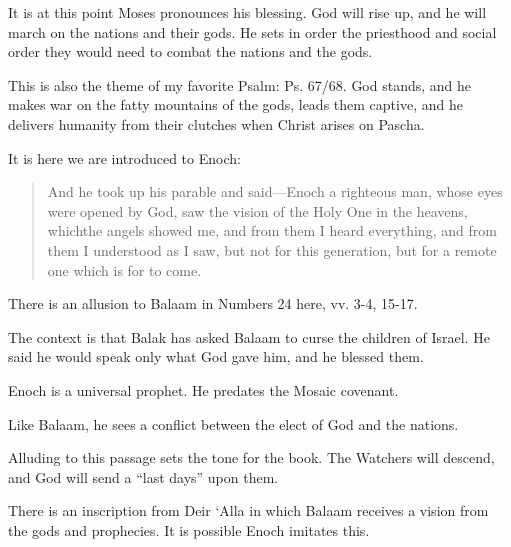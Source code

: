 \documentclass{beamer}
\begin{document}
\begin{frame}
  It is at this point Moses pronounces his blessing.
  God will rise up, and he will march on the nations and their gods.
  He sets in order the priesthood and social order they would need to combat the nations and the gods.
\end{frame}

\begin{frame}
  This is also the theme of my favorite Psalm: Ps. 67/68.
  God stands, and he makes war on the fatty mountains of the gods, leads them captive, and he delivers humanity from their clutches when Christ arises on Pascha.
\end{frame}

\begin{frame}
  It is here we are introduced to Enoch:
  \begin{quote}
	And he took up his parable and said—Enoch a righteous man, whose eyes were opened by God, saw the vision of the Holy One in the heavens, whichthe angels showed me, and from them I heard everything, and from them I understood as I saw, but not for this generation, but for a remote one which is for to come.
  \end{quote}
\end{frame}

\begin{frame}
  There is an allusion to Balaam in Numbers 24 here, vv. 3-4, 15-17.
\end{frame}

\begin{frame}
  The context is that Balak has asked Balaam to curse the children of Israel.
  He said he would speak only what God gave him, and he blessed them.
\end{frame}

\begin{frame}
  Enoch is a universal prophet.
  He predates the Mosaic covenant.
\end{frame}

\begin{frame}
  Like Balaam, he sees a conflict between the elect of God and the nations.
\end{frame}

\begin{frame}
  Alluding to this passage sets the tone for the book.
  The Watchers will descend, and God will send a ``last days'' upon them.
\end{frame}

\begin{frame}
  There is an inscription from Deir `Alla in which Balaam receives a vision from the gods and prophecies.
  It is possible Enoch imitates this.
\end{frame}
\end{document}
